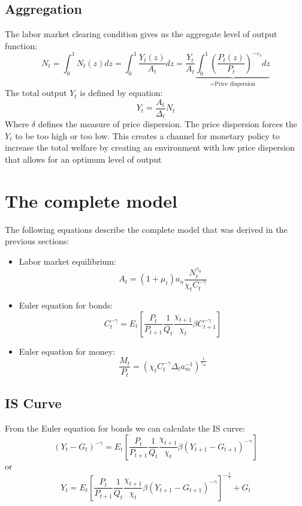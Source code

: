 \documentclass[10pt,a4paper]{article}
\begin{document}
\subsection{Aggregation}
The labor market clearing condition gives us the aggregate level of output function:
\begin{equation}
N_t=\int_{0}^{1}N_t(z)dz=
\int_{0}^{1}\frac{Y_t(z)}{A_t}dz=
\frac{Y_t}{A_t}\underbrace{\int_{0}^{1}\left(\frac{P_t(z)}{P_t}\right)^{-\varepsilon_t}dz
}_{\text{=Price dispersion}}
\end{equation}
The total output $Y_t$ is defined by equation:
\begin{equation}
Y_t=\frac{A_t}{\Delta_t}N_t
\end{equation}
Where $\delta$ defines the measure of price dispersion. The price dispersion forces the $Y_t$ to be too high or too low. This creates a channel for monetary policy to increase the total welfare by creating an environment with low price dispersion that allows for an optimum level of output
\section{The complete model}
The following equations describe the complete model that was derived in the previous sections:
\begin{itemize}
\item Labor market equilibrium:
\begin{equation}\label{eq:labor}
A_t= (1+\mu_t)a_n \frac{N_t^{\gamma_n}}{\chi_t C_t^{-\gamma}}
\end{equation}
\item Euler equation for bonds:
\begin{equation}\label{eq:bonds}
C_t^{-\gamma}= E_t \left[ \frac{P_t}{P_{t+1}} \frac{1}{Q_t} \frac{\chi_{t+1}}{\chi_t} \beta C_{t+1}^{-\gamma}\right]
\end{equation}
\item Euler equation for money:
\begin{equation}\label{eq:money}
\frac{M_t}{P_t}=\left(
\chi_{t} C_t^{-\gamma} \Delta_t a_m^{-1} \right)^{\frac{1}{\gamma_m}}
\end{equation}
\end{itemize}
\subsection{IS Curve}
From the Euler equation for bonds we can calculate the IS curve:
$$(Y_t-G_t)^{-\gamma}= E_t \left[
\frac{P_t}{P_{t+1}} \frac{1}{Q_t} \frac{\chi_{t+1}}{\chi_t} \beta (Y_{t+1}-G_{t+1})^{-\gamma} \right]$$
or
$$Y_t= E_t \left[
\frac{P_t}{P_{t+1}} \frac{1}{Q_t} \frac{\chi_{t+1}}{\chi_t} \beta (Y_{t+1}-G_{t+1})^{-\gamma} \right]^{-\frac{1}{\gamma}}+G_t$$
\end{document}
